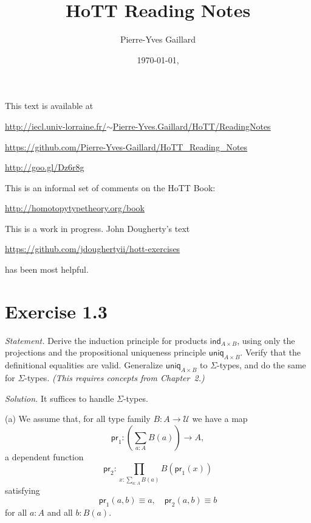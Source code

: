 \documentclass[12pt]{article}
\title{HoTT Reading Notes}
\author{Pierre-Yves Gaillard}
\date{\today, \currenttime}
\newcommand{\ind}{\mathsf{ind}}
\newcommand{\nn}{\noindent}
\newcommand{\pr}{\mathsf{pr}}
\newcommand{\U}{\mathcal U}
\newcommand{\uniq}{\mathsf{uniq}}
\begin{document}

\maketitle%

\nn This text is available at 

\nn\href{http://iecl.univ-lorraine.fr/~Pierre-Yves.Gaillard/HoTT/ReadingNotes}{http://iecl.univ-lorraine.fr/$\sim$Pierre-Yves.Gaillard/HoTT/ReadingNotes}


\nn\href{https://github.com/Pierre-Yves-Gaillard/HoTT_Reading_Notes}{https://github.com/Pierre-Yves-Gaillard/HoTT\_Reading\_Notes}

\nn\href{http://goo.gl/Dz6r8g}{http://goo.gl/Dz6r8g}

This is an informal set of comments on the HoTT Book:

\nn\href{http://homotopytypetheory.org/book}{http://homotopytypetheory.org/book}

This is a work in progress. John Dougherty's text 

\nn\href{https://github.com/jdoughertyii/hott-exercises}{https://github.com/jdoughertyii/hott-exercises}

\nn has been most helpful.

\tableofcontents%


\section{Exercise 1.3} 

\emph{Statement.} Derive the induction principle for products $\ind_{A\times B}$, using only the projections and the propositional uniqueness principle $\uniq_{A\times B}$. Verify that the definitional equalities are valid. Generalize $\uniq_{A\times B}$ to $\Sigma$-types, and do the same for $\Sigma$-types. \emph{(This requires concepts from Chapter~2.)}

\nn\emph{Solution.} It suffices to handle $\Sigma$-types. 

\nn(a) We assume that, for all type family $B:A\to\U$ we have a map 
$$
\pr_1:\left(\sum_{a:A}B(a)\right)\to A,
$$ 
a dependent function 
$$
\pr_2:\prod_{x:\sum_{a:A}B(a)}B(\pr_1(x))
$$
satisfying
\begin{equation}\label{131}
\pr_1(a,b)\equiv a,\quad\pr_2(a,b)\equiv b
\end{equation}
for all $a:A$ and all $b:B(a)$.
\end{document}
